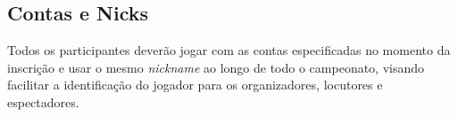 \subsection{Contas e Nicks}

Todos os participantes deverão jogar com as contas especificadas no momento da inscrição e usar o mesmo \textit{nickname} ao longo de todo o campeonato, visando facilitar a identificação do jogador para os organizadores, locutores e espectadores.
